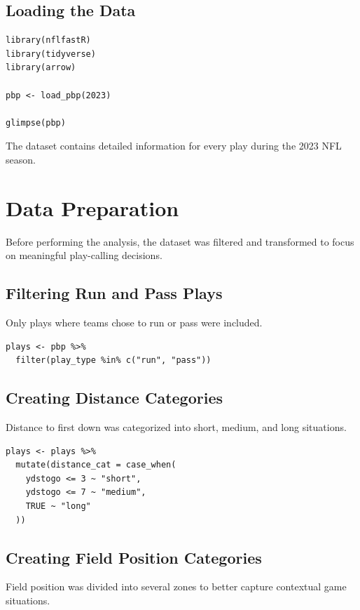 \documentclass[12pt]{article}
\begin{document}
\subsection{Loading the Data}

\begin{lstlisting}
library(nflfastR)
library(tidyverse)
library(arrow)

pbp <- load_pbp(2023)

glimpse(pbp)
\end{lstlisting}

The dataset contains detailed information for every play during the 2023 NFL season.

\section{Data Preparation}

Before performing the analysis, the dataset was filtered and transformed to focus on meaningful play-calling decisions.

\subsection{Filtering Run and Pass Plays}

Only plays where teams chose to run or pass were included.

\begin{lstlisting}
plays <- pbp %>%
  filter(play_type %in% c("run", "pass"))
\end{lstlisting}

\subsection{Creating Distance Categories}

Distance to first down was categorized into short, medium, and long situations.

\begin{lstlisting}
plays <- plays %>%
  mutate(distance_cat = case_when(
    ydstogo <= 3 ~ "short",
    ydstogo <= 7 ~ "medium",
    TRUE ~ "long"
  ))
\end{lstlisting}

\subsection{Creating Field Position Categories}

Field position was divided into several zones to better capture contextual game situations.
\end{document}
